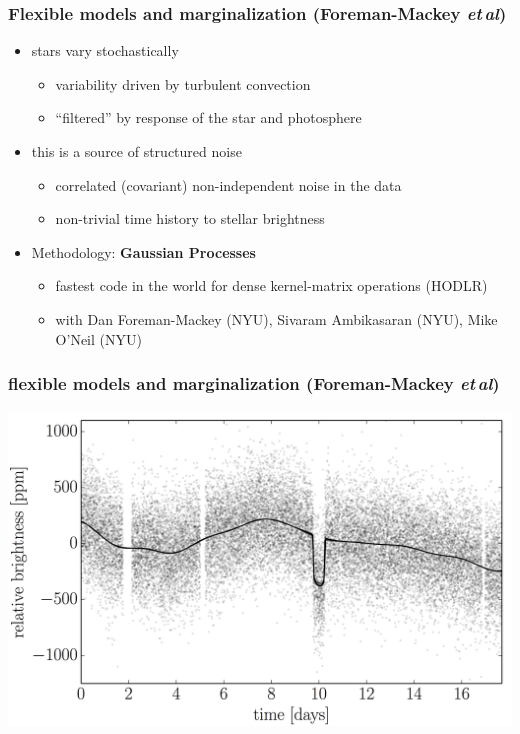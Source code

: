 \documentclass{beamer}
\newcommand{\foreign}[1]{\textsl{#1}}
\newcommand{\etal}{\foreign{et\,al}}
\renewcommand{\emph}[1]{\textbf{#1}}
\begin{document}
\begin{frame}
  \frametitle{Flexible models and marginalization \small{(Foreman-Mackey \etal)}}
  \begin{itemize}
  \item stars vary stochastically
    \begin{itemize}
    \item variability driven by turbulent convection
    \item ``filtered'' by response of the star and photosphere
    \end{itemize}
  \item this is a source of structured noise
    \begin{itemize}
    \item correlated (covariant) non-independent noise in the data
    \item non-trivial time history to stellar brightness
    \end{itemize}
  \item Methodology: \emph{Gaussian Processes}
    \begin{itemize}
    \item fastest code in the world for dense kernel-matrix operations (HODLR)
    \item with Dan Foreman-Mackey (NYU), Sivaram Ambikasaran (NYU), Mike O'Neil (NYU)
    \end{itemize}
  \end{itemize}
\end{frame}

\begin{frame}
  \frametitle{flexible models and marginalization \small{(Foreman-Mackey \etal)}}
  \includegraphics[width=\textwidth]{kepler-prediction.png}
\end{frame}
\end{document}
